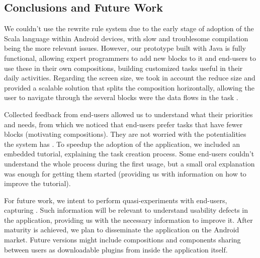 \documentclass[9pt,a4paper]{extarticle}
\begin{document}
\begin{multicols}{2}
\section{Conclusions and Future Work}\label{sec:conclui}

We couldn't use the rewrite rule system due to the early stage of adoption of the Scala language within Android devices, with slow and troublesome compilation being the more relevant issues. However, our prototype built with Java is fully functional, allowing expert programmers to add new blocks to it and end-users to use these in their own compositions, building customized tasks useful in their daily activities. Regarding the screen size, we took in account the reduce size and provided a scalable solution that splits the composition horizontally, allowing the user to navigate through the several blocks were the data flows in the task . 

Collected feedback from end-users allowed us to understand what their priorities and needs, from which we noticed that end-users prefer tasks that have fewer blocks (motivating compositions). They are not worried with the potentialities the system has . To speedup the adoption of the application, we included an embedded tutorial, explaining the task creation process. Some end-users couldn't understand the whole process during the first usage, but a small oral explanation was enough for getting them started (providing us with information on how to improve the tutorial).   

For future work, we intent to perform quasi-experiments with end-users, capturing . Such information will be relevant to understand usability defects in the application, providing us with the necessary information to improve it. After maturity is achieved, we plan to disseminate the application on the Android market. Future versions might include compositions and components sharing between users as downloadable plugins from inside the application itself.



\end{multicols}
\end{document}
